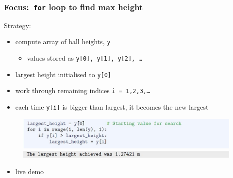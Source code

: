 \documentclass[english,14pt]{beamer}
\begin{document}
\begin{frame}[fragile]

\frametitle{Focus:~\texttt{for} loop to find max height}

Strategy:
\begin{itemize}
	\item compute array of ball heights, \texttt{y}
	\begin{itemize}
		\item values stored as \texttt{y[0], y[1], y[2], \ldots}
	\end{itemize}
	\item largest height initialised to \texttt{y[0]}
	\item work through remaining indices \texttt{i = 1,2,3,\ldots}
	\item each time \texttt{y[i]} is bigger than largest, it becomes the new largest
\end{itemize}

\begin{figure}[ht]
	\centering
	\includegraphics[width=\textwidth]{figures/LLp71b}
	\includegraphics[width=\textwidth]{figures/LLp71c}
\end{figure}
\vspace*{-3mm}
\begin{itemize}
	\item live demo
\end{itemize}

\end{frame}

\end{document}
